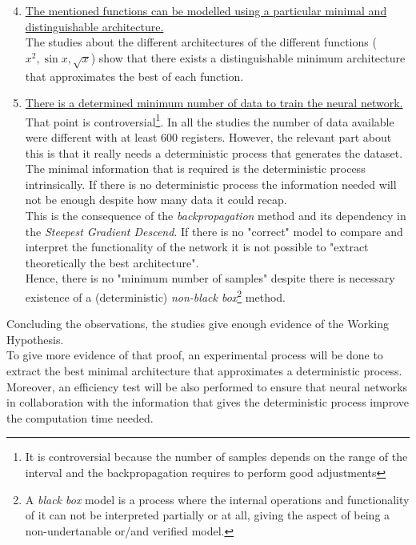\documentclass[a4paper, 11pt]{article}
\begin{document}
\begin{enumerate}
    \setcounter{enumi}{3}
    \item \underline{The mentioned functions can be modelled using a particular minimal and}\\
    \underline{distinguishable architecture.}\vspace{0.5em}\\
 The studies about the different architectures of the different functions ($x^2, \sin{x}, \sqrt{x}$) show that there exists a distinguishable minimum architecture that approximates the best of each function.\\
    \item \underline{There is a determined minimum number of data to train the neural network.}\vspace{0.5em}\\
 That point is controversial\footnote{It is controversial because the number of samples depends on the range of the interval and the backpropagation requires to perform good adjustments}. In all the studies the number of data available were different with at least $600$ registers. However, the relevant part about this is that it really needs a deterministic process that generates the dataset.\\
 The minimal information that is required is the deterministic process intrinsically. If there is no deterministic process the information needed will not be enough despite how many data it could recap.\\
 This is the consequence of the \textit{backpropagation} method and its dependency in the \textit{Steepest Gradient Descend}. If there is no "correct" model to compare and interpret the functionality of the network it is not possible to "extract theoretically the best architecture".\\
 Hence, there is no "minimum number of samples" despite there is necessary existence of a (deterministic) \textit{non-black box}\footnote{A \textit{black box} model is a process where the internal operations and functionality of it can not be interpreted partially or at all, giving the aspect of being a non-undertanable or/and verified model.} method.
\end{enumerate}
Concluding the observations, the studies give enough evidence of the Working Hypothesis.\\
To give more evidence of that proof, an experimental process will be done to extract the best minimal architecture that approximates a deterministic process.\\
Moreover, an efficiency test will be also performed to ensure that neural networks in collaboration with the information that gives the deterministic process improve the computation time needed.
\end{document}
